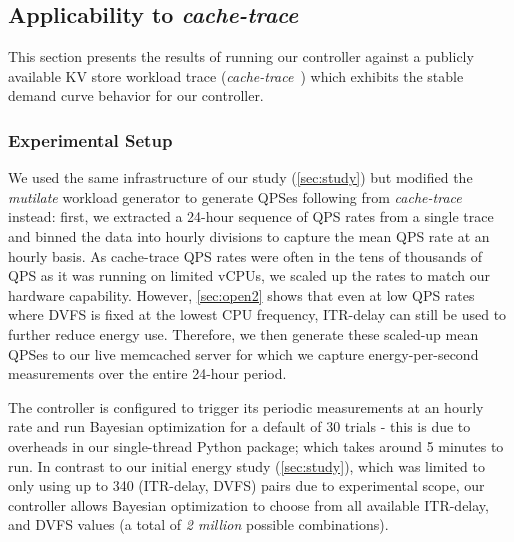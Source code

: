 \subsection{Applicability to \textit{cache-trace}}
\label{sec:cachetrace2}
This section presents the results of running our controller against a publicly available KV store workload trace (\textit{cache-trace}~\cite{cacheWorkload-OSDI20}) which exhibits the stable demand curve behavior for our controller. 

\subsubsection{Experimental Setup}
We used the same infrastructure of our study (\cref{sec:study}) but modified the \textit{mutilate} workload generator to generate QPSes following from \textit{cache-trace} instead: first, we extracted a 24-hour sequence of QPS rates from a single trace and binned the data into hourly divisions to capture the mean QPS rate at an hourly basis. As cache-trace QPS rates were often in the tens of thousands of QPS as it was running on limited vCPUs, we scaled up the rates to match our hardware capability. However, \ref{sec:open2} shows that even at low QPS rates where DVFS is fixed at the lowest CPU frequency, ITR-delay can still be used to further reduce energy use. Therefore, we then generate these scaled-up mean QPSes to our live memcached server for which we capture energy-per-second measurements over the entire 24-hour period. 

The controller is configured to trigger its periodic measurements at an hourly rate and run Bayesian optimization for a default of 30 trials - this is due to overheads in our single-thread Python package; which takes around 5 minutes to run. In contrast to our initial energy study (\cref{sec:study}), which was limited to only using up to 340 (ITR-delay,  DVFS) pairs due to experimental scope, our controller allows Bayesian optimization to choose from all available ITR-delay, and DVFS values (a total of \textit{2 million} possible combinations). 

